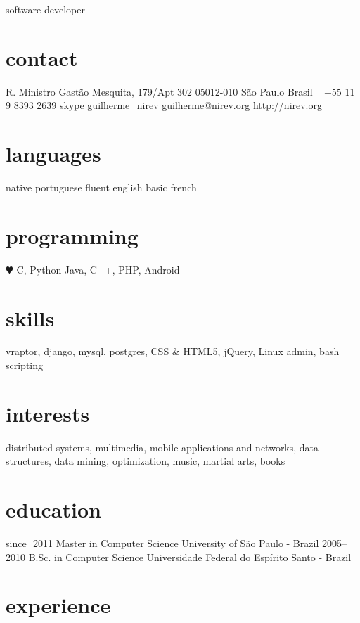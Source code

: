 \documentclass{friggeri-cv}
\begin{document}
       {software developer}


\begin{aside}
  \section{contact}
    R. Ministro Gastão Mesquita, 179/Apt 302
    05012-010 São Paulo
    Brasil
    ~
    +55 11 9 8393 2639
    {\footnotesize skype} guilherme\_nirev
    \href{mailto:guilherme@nirev.org}{guilherme@nirev.org}
    \href{http://nirev.org}{http://nirev.org}
  \section{languages}
    native portuguese
    fluent english
    basic french
  \section{programming}
    {\color{red} $\varheartsuit$} C, Python
    Java, C++, PHP, Android
  \section{skills}
    vraptor, django,
    mysql, postgres,
    CSS \& HTML5,
    jQuery, Linux admin,
    bash scripting
  \section{interests}
distributed systems, multimedia, mobile applications and networks, data structures, data mining, optimization, music, martial arts,
books
\end{aside}


\section{education}

\begin{entrylist}

\entry
  {since $\,\,$2011}
  {Master in Computer Science}
  {University of São Paulo - Brazil}{}
\entry
  {2005–2010}
  {B.Sc. in Computer Science}
  {Universidade Federal do Espírito Santo - Brazil}{}
\end{entrylist}

\section{experience}
\end{document}
